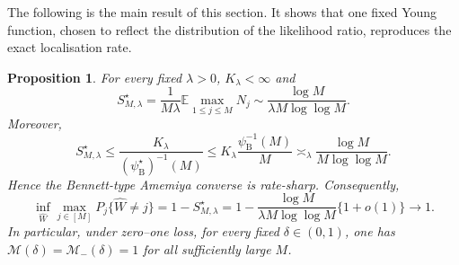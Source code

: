\documentclass[11pt]{article}
\newtheorem{proposition}[theorem]{Proposition}
\theoremstyle{definition}
\theoremstyle{remark}
\newcommand{\Ee}{\mathbb E}
\newcommand{\1}{\boldsymbol{1}}
\newcommand{\cM}{\mathcal M}
\begin{document}
The following is the main result of this section. It shows that one fixed
Young function, chosen to reflect the distribution of the likelihood ratio,
reproduces the exact localisation rate.

\begin{proposition}
\label{prop:taggedPoisson}
For every fixed \(\lambda>0\), \(K_\lambda<\infty\) and
\begin{equation}
S_{M,\lambda}^\star
=
\frac{1}{M\lambda}\Ee\max_{1\le j\le M}N_j
\sim
\frac{\log M}{\lambda M\log\log M}.
\label{eq:taggedPoissonExactRate}
\end{equation}
Moreover,
\begin{equation}
S_{M,\lambda}^\star
\le
\frac{K_\lambda}{(\psi_{\mathrm B}^\star)^{-1}(M)}
\le
K_\lambda\frac{\psi_{\mathrm B}^{-1}(M)}{M}
\asymp_\lambda
\frac{\log M}{M\log\log M}.
\label{eq:taggedPoissonAmemiyaRate}
\end{equation}
Hence the Bennett-type Amemiya converse is rate-sharp. Consequently,
\[
\inf_{\widehat W}\max_{j\in[M]}P_j\{\widehat W\neq j\}
=
1-S_{M,\lambda}^\star
=
1-\frac{\log M}{\lambda M\log\log M}\{1+o(1)\}
\longrightarrow1.
\]
In particular, under zero--one loss, for every fixed
\(\delta\in(0,1)\), one has
\(\cM(\delta)=\cM_-(\delta)=1\) for all sufficiently large \(M\).
\end{proposition}
\end{document}
